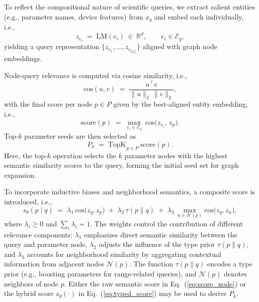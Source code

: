 \documentclass[journal]{IEEEtran}
\begin{document}
To reflect the compositional nature of scientific queries, we extract salient entities (e.g., parameter names, device features) from $x_q$ and embed each individually, i.e.,
\begin{equation}
z_{e_i} \;=\; \mathrm{LM}(e_i)\ \in\ \mathbb{R}^{d}, 
\qquad e_i \in \mathcal{E}_q,
\label{eq:entity_embed}
\end{equation}
yielding a query representation $\{z_{e_1},\ldots,z_{e_{|\mathcal{E}_q|}}\}$ aligned with graph node embeddings.

Node-query relevance is computed via cosine similarity, i.e.,
\begin{equation}
\mathrm{cos}(u,v) \;=\; \frac{u^{\top}v}{\lVert u\rVert_2\,\lVert v\rVert_2},
\label{eq:cosine}
\end{equation}
with the final score per node $p \in P$ given by the best-aligned entity embedding, i.e.,
\begin{equation}
\mathrm{score}(p) \;=\; \max_{e_i \in \mathcal{E}_q}\ \mathrm{cos}\!\bigl(z_{e_i},\, z_p\bigr).
\label{eq:score_node}
\end{equation}
Top-$k$ parameter seeds are then selected as
\begin{equation}
P_k \;=\; \mathrm{TopK}_{\,p\in P}\ \mathrm{score}(p).
\label{eq:topk}
\end{equation}
Here, the top-$k$ operation selects the $k$ parameter nodes with the highest semantic similarity scores to the query, forming the initial seed set for graph expansion.

To incorporate inductive biases and neighborhood semantics, a composite score is introduced, i.e.,
\begin{equation}
s_{\theta}(p\mid q) \;=\; 
\lambda_1\,\mathrm{cos}\!\bigl(z_q, z_p\bigr)
\;+\; \lambda_2\,\tau(p \parallel q)
\;+\; \lambda_3\,\max_{u\in \mathcal{N}(p)} \mathrm{cos}\!\bigl(z_q, z_u\bigr),
\label{eq:typed_score}
\end{equation}
{where $\lambda_i \ge 0$ and $\sum_i \lambda_i = 1$. 
The weights control the contribution of different relevance components: 
$\lambda_1$ emphasizes direct semantic similarity between the query and parameter node, 
$\lambda_2$ adjusts the influence of the type prior $\tau(p \parallel q)$, 
and $\lambda_3$ accounts for neighborhood similarity by aggregating contextual information from adjacent nodes $\mathcal{N}(p)$. 
The function $\tau(p \parallel q)$ encodes a type prior (e.g., boosting parameters for range-related queries), 
and $\mathcal{N}(p)$ denotes neighbors of node $p$. 
Either the raw semantic score in Eq.~(\ref{eq:score_node}) or the hybrid score $s_{\theta}(\cdot)$ in Eq.~(\ref{eq:typed_score}) may be used to derive $P_k$.}
\end{document}
